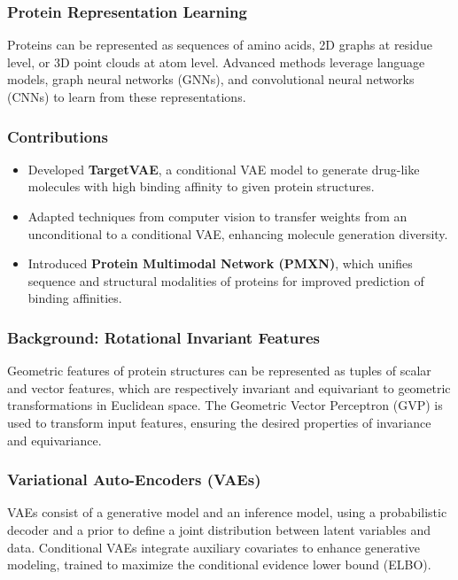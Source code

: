 \documentclass[11pt,xcolor={dvipsnames},hyperref={pdftex,pdfpagemode=UseNone,hidelinks,pdfdisplaydoctitle=true},usepdftitle=false]{beamer}
\begin{document}
\begin{frame}
    \frametitle{Protein Representation Learning}
    Proteins can be represented as sequences of amino acids, 2D graphs at residue level, or 3D point clouds at atom level. Advanced methods leverage language models, graph neural networks (GNNs), and convolutional neural networks (CNNs) to learn from these representations.
    
\end{frame}

\begin{frame}
    \frametitle{Contributions}
    \begin{itemize}
        \item Developed \textbf{TargetVAE}, a conditional VAE model to generate drug-like molecules with high binding affinity to given protein structures.
        \item Adapted techniques from computer vision to transfer weights from an unconditional to a conditional VAE, enhancing molecule generation diversity.
        \item Introduced \textbf{Protein Multimodal Network (PMXN)}, which unifies sequence and structural modalities of proteins for improved prediction of binding affinities.
    \end{itemize}
\end{frame}

\begin{frame}
    \frametitle{Background: Rotational Invariant Features}
    Geometric features of protein structures can be represented as tuples of scalar and vector features, which are respectively invariant and equivariant to geometric transformations in Euclidean space. The Geometric Vector Perceptron (GVP) is used to transform input features, ensuring the desired properties of invariance and equivariance.
    
\end{frame}

\begin{frame}
    \frametitle{Variational Auto-Encoders (VAEs)}
    VAEs consist of a generative model and an inference model, using a probabilistic decoder and a prior to define a joint distribution between latent variables and data. Conditional VAEs integrate auxiliary covariates to enhance generative modeling, trained to maximize the conditional evidence lower bound (ELBO).
    
\end{frame}
    
\end{document}
